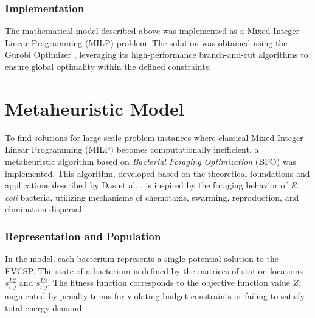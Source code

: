 \documentclass{article}
\begin{document}
\subsubsection{Implementation}
The mathematical model described above was implemented as a Mixed-Integer Linear Programming (MILP) problem. The solution was obtained using the Gurobi Optimizer \cite{gurobi}, leveraging its high-performance branch-and-cut algorithms to ensure global optimality within the defined constraints.

\section{Metaheuristic Model}
To find solutions for large-scale problem instances where classical Mixed-Integer Linear Programming (MILP) becomes computationally inefficient, a metaheuristic algorithm based on \textit{Bacterial Foraging Optimization} (BFO) was implemented. This algorithm, developed based on the theoretical foundations and applications described by Das et al. \cite{das2009bacterial}, is inspired by the foraging behavior of \textit{E. coli} bacteria, utilizing mechanisms of chemotaxis, swarming, reproduction, and elimination-dispersal.

\subsubsection{Representation and Population}
In the model, each bacterium represents a single potential solution to the EVCSP. The state of a bacterium is defined by the matrices of station locations $s_{i,j}^{L2}$ and $s_{i,j}^{L3}$. The fitness function corresponds to the objective function value $Z$, augmented by penalty terms for violating budget constraints or failing to satisfy total energy demand.
\end{document}
